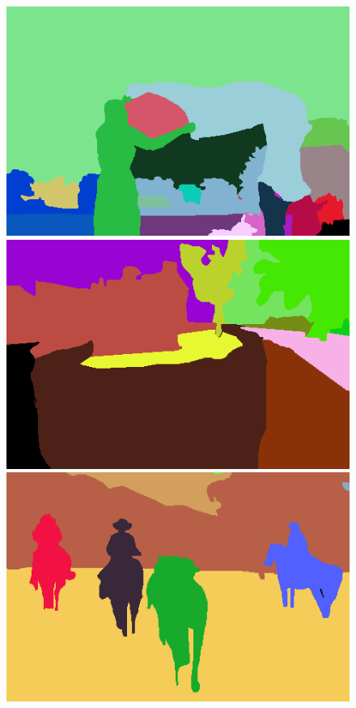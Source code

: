 \begin{figure}[h]
{\begin{minipage}[b]{0.13\linewidth}
\includegraphics[width=1\linewidth]{figures/img/gt/gt_80085.png}
\includegraphics[width=1\linewidth]{figures/img/gt/gt_92014.png}
\includegraphics[width=1\linewidth]{figures/img/gt/gt_220003.png}

\end{minipage}}
\end{figure}

